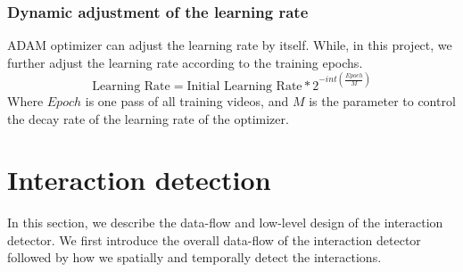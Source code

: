 \subsubsection*{Dynamic adjustment of the learning rate}
\label{learning_rate}
ADAM optimizer can adjust the learning rate by itself. While, in this project, we further adjust the learning rate according to the training epochs. 
\begin{equation}
\text{Learning Rate} = \text{Initial Learning Rate} * 2^{-int(\frac{Epoch}{M})}
\end{equation} 
Where \(Epoch\) is one pass of all training videos, and \(M\) is the parameter to control the decay rate of the learning rate of the optimizer. 

\section{Interaction detection}
In this section, we describe the data-flow and low-level design of the interaction detector. We first introduce the overall data-flow of the interaction detector followed by how we spatially and temporally detect the interactions. 

